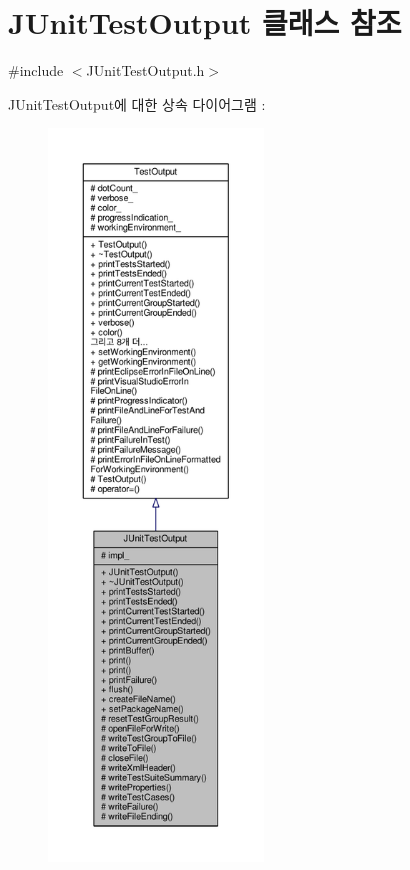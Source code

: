 \hypertarget{class_j_unit_test_output}{}\section{J\+Unit\+Test\+Output 클래스 참조}
\label{class_j_unit_test_output}


{\ttfamily \#include $<$J\+Unit\+Test\+Output.\+h$>$}



J\+Unit\+Test\+Output에 대한 상속 다이어그램 \+: 
\nopagebreak
\begin{figure}[H]
\begin{center}
\leavevmode
\includegraphics[height=550pt]{class_j_unit_test_output__inherit__graph}
\end{center}
\end{figure}


